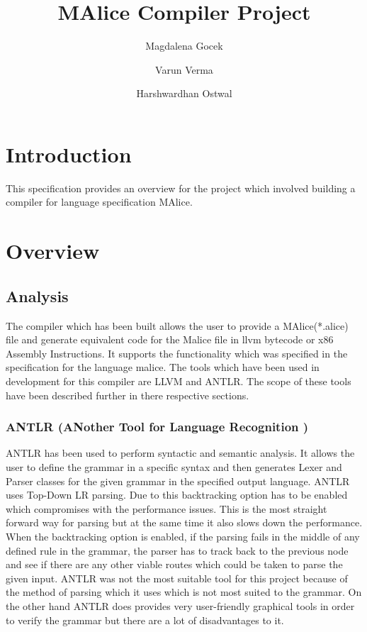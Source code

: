 \documentclass[a4wide, 11pt]{article}
\begin{document}
\title{MAlice Compiler Project}

\author{Magdalena Gocek \and Varun Verma \and Harshwardhan Ostwal}

\maketitle            %

\section{Introduction}
\label{sec:intro}
	This specification provides an overview for the project which involved building a compiler for language specification MAlice.
	
\section{Overview}
	\subsection{Analysis}
		The compiler which has been built allows the user to provide a MAlice(*.alice) file and generate equivalent code
		for the Malice file in llvm bytecode or x86 Assembly Instructions. It supports the functionality which was specified in
		the specification for the language malice. The tools which have been used in development for this compiler are LLVM and ANTLR.
		The scope of these tools have been described further in there respective sections.
		\subsubsection{ANTLR (ANother Tool for Language Recognition )}
			ANTLR has been used to perform syntactic and semantic analysis. It allows the user to define the grammar in a 
			specific syntax and then generates Lexer and Parser classes for the given grammar in the specified output language.
			ANTLR uses Top-Down LR parsing. Due to this backtracking option has to be enabled which 
			compromises with the performance issues. This is the most straight forward way for parsing but at the same
			time it also slows down the performance. When the backtracking option is enabled, if the parsing fails in the middle
			of any defined rule in the grammar, the parser has to track back to the previous node and see if there are
			any other viable routes which could be taken to parse the given input. ANTLR was not the most suitable tool for this
			project because of the method of parsing which it uses which is not most suited to the grammar. 
			On the other hand ANTLR does provides very user-friendly graphical tools in order to verify the grammar but there are 
			a lot of disadvantages to it.
			
\end{document}
